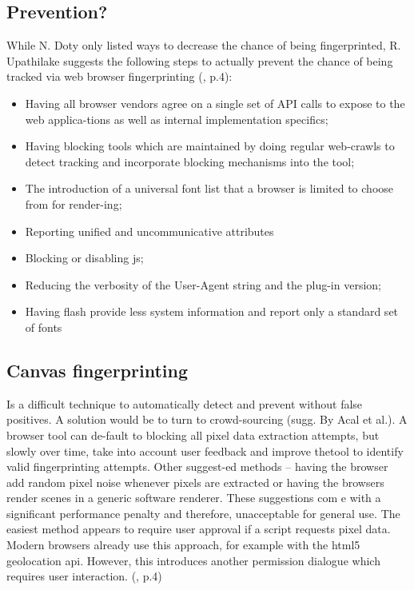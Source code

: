 \subsection{Prevention?}
While N. Doty only listed ways to decrease the chance of being fingerprinted, R. Upathilake suggests the following steps to actually prevent the chance of being tracked via web browser fingerprinting (\textcite{upi15}, p.4):
\begin{itemize}
	\item Having all browser vendors agree on a single set of API calls to expose to the web applica-tions as well as internal implementation specifics;
	\item Having blocking tools which are maintained by doing regular web-crawls to detect tracking and incorporate blocking mechanisms into the tool;
	\item The introduction of a universal font list that a browser is limited to choose from for render-ing;
	\item Reporting unified and uncommunicative attributes
	\item Blocking or disabling js;
	\item Reducing the verbosity of the User-Agent string and the plug-in version;
	\item 	Having flash provide less system information and report only a standard set of fonts \\
\end{itemize}

\subsection{Canvas fingerprinting}
Is a difficult technique to automatically detect and prevent without false positives. A solution would be to turn to crowd-sourcing (sugg. By Acal et al.). A browser tool can de-fault to blocking all pixel data extraction attempts, but slowly over time, take into account user feedback and improve thetool to identify valid fingerprinting attempts. Other suggest-ed methods – having the browser add random pixel noise whenever pixels are extracted or having the browsers render scenes in a generic software renderer. These suggestions com e with a significant performance penalty and therefore, unacceptable for general use. The easiest method appears to require user approval if a script requests pixel data. Modern browsers already use this approach, for example with the html5 geolocation api. However, this introduces another permission dialogue which requires user interaction.
(\textcite{upi15}, p.4)

